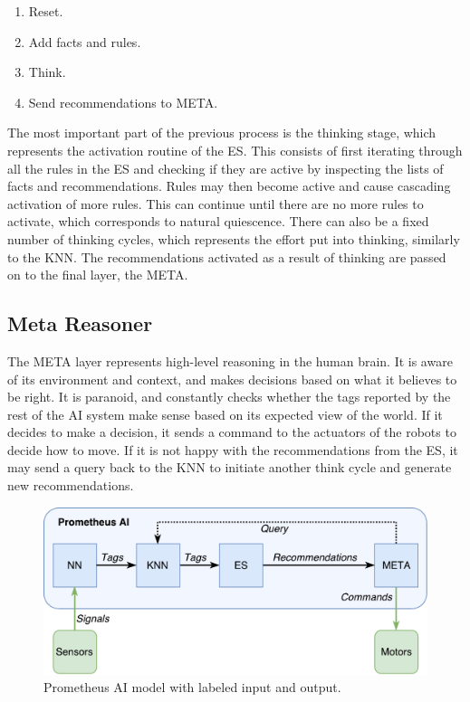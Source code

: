 \documentclass[titlepage,11pt]{article}
\begin{document}
\begin{enumerate}
	\item Reset.
	\item Add facts and rules.
	\item Think.
	\item Send recommendations to META.
\end{enumerate}

The most important part of the previous process is the thinking stage, which represents the activation routine of the ES. This consists of first iterating through all the rules in the ES and checking if they are active by inspecting the lists of facts and recommendations. Rules may then become active and cause cascading activation of more rules. This can continue until there are no more rules to activate, which corresponds to natural quiescence. There can also be a fixed number of thinking cycles, which represents the effort put into thinking, similarly to the KNN. The recommendations activated as a result of thinking are passed on to the final layer, the META.

\subsection{Meta Reasoner}

The META layer represents high-level reasoning in the human brain. It is aware of its environment and context, and makes decisions based on what it believes to be right. It is paranoid, and constantly checks whether the tags reported by the rest of the AI system make sense based on its expected view of the world. If it decides to make a decision, it sends a command to the actuators of the robots to decide how to move. If it is not happy with the recommendations from the ES, it may send a query back to the KNN to initiate another think cycle and generate new recommendations.

\begin{figure}[!htb]
	\includegraphics[width=\textwidth]{figures/ai_model_labeled.pdf}
	\caption{Prometheus AI model with labeled input and output.}
	\label{model_labeled}
\end{figure}
\end{document}
